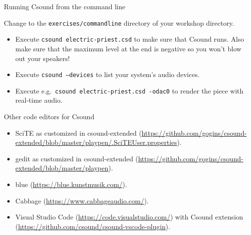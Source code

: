 \documentclass{beamer}
\begin{document}
\begin{frame}{Running Csound from the command line}
\begin{example}
Change to the \texttt{exercises/commandline} directory of your workshop directory.
\begin{itemize}
\item Execute \texttt{csound electric-priest.csd} to make sure that Csound runs.  Also make sure that the maximum level at the end is negative so you won't blow out your speakers!
\item Execute \texttt{csound ---devices} to list your system's audio devices.
\item Execute e.g.\  \texttt{csound electric-priest.csd -odac0} to render the piece with real-time audio.
\end{itemize}
\end{example}
\end{frame}

\begin{frame}{Other code editors for Csound}
\begin{itemize}
\item SciTE as customized in csound-extended (\url{https://github.com/gogins/csound-extended/blob/master/playpen/.SciTEUser.properties}).
\item gedit as customized in csound-extended (\url{https://github.com/gogins/csound-extended/blob/master/playpen}).
\item blue (\url{https://blue.kunstmusik.com/}).
\item Cabbage (\url{https://www.cabbageaudio.com/}).
\item Visual Studio Code (\url{https://code.visualstudio.com/}) with
Csound extension (\url{https://github.com/csound/csound-vscode-plugin}).
\end{itemize}
\end{frame}
\end{document}
